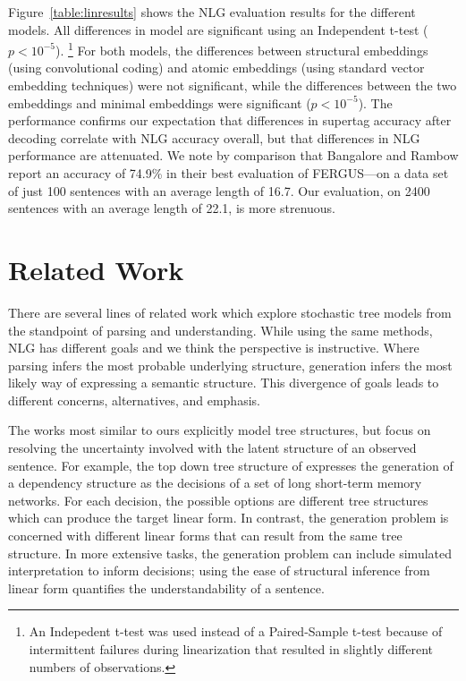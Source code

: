\documentclass[11pt]{article}
\begin{document}
Figure~\ref{table:linresults} shows the NLG evaluation results for the
different models.
%
All differences in model are significant using an Independent t-test ($p<10^{-5}$).  \footnote{An Indepedent t-test was used instead of a Paired-Sample t-test because of intermittent failures during linearization that resulted in slightly different numbers of observations.}
%
For both models, the differences between structural embeddings (using convolutional coding) and atomic embeddings (using standard vector embedding techniques) were not significant, while the differences between the two embeddings and minimal embeddings were significant ($p<10^{-5}$). 
%
The performance confirms our expectation that differences in supertag
accuracy after decoding correlate with NLG accuracy overall, but that
differences in NLG performance are attenuated.
%
We note by comparison that Bangalore and Rambow report an accuracy of
74.9\% in their best evaluation of FERGUS---on a data set of just 100
sentences with an average length of 16.7.
%
Our evaluation, on 2400 sentences with an average length of 22.1, is
more strenuous.

\section{Related Work}
\label{sec:relatedwork}

There are several lines of related work which explore stochastic tree
models from the standpoint of parsing and understanding.
%
While using the same methods, NLG has different goals and we think the perspective is instructive. 
%
Where parsing infers the most probable underlying structure,
generation infers the most likely way of expressing a semantic
structure.
%
This divergence of goals leads to different concerns, alternatives, and emphasis. 


The works most similar to ours explicitly model tree structures, but focus on resolving the uncertainty involved with the latent structure of an observed sentence. 
%
For example, the top down tree structure of  expresses the generation of a dependency structure as the decisions of a set of long short-term memory networks.  
%
For each decision, the possible options are different tree structures which can produce the target linear form.
%
In contrast, the generation problem is concerned with different linear forms that can result from the same tree structure. 
%
In more extensive tasks, the generation problem can include simulated interpretation to inform decisions; using the ease of structural inference from linear form quantifies the understandability of a sentence. 
\end{document}

